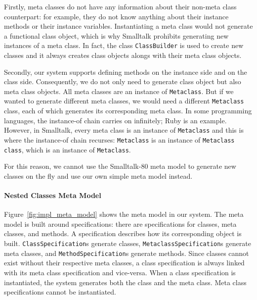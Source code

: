 Firstly, meta classes do not have any information about their non-meta class counterpart: for example, they do not know anything about their instance methods or their instance variables. Instantiating a meta class would not generate a functional class object, which is why Smalltalk prohibits generating new instances of a meta class. In fact, the class \texttt{ClassBuilder} is used to create new classes and it always creates class objects alongs with their meta class objects.

Secondly, our system supports defining methods on the instance side and on the class side. Consequently, we do not only need to generate class object but also meta class objects. All meta classes are an instance of \texttt{Metaclass}. But if we wanted to generate different meta classes, we would need a different \texttt{Metaclass} class, each of which generates its corresponding meta class. In some programming languages, the instance-of chain carries on infinitely; Ruby is an example. However, in Smalltalk, every meta class is an instance of \texttt{Metaclass} and this is where the instance-of chain recurses: \texttt{Metaclass} is an instance of \texttt{Metaclass class}, which is an instance of \texttt{Metaclass}.

For this reason, we cannot use the Smalltalk-80 meta model to generate new classes on the fly and use our own simple meta model instead.

\paragraph{Nested Classes Meta Model}
Figure~\ref{fig:impl_meta_model} shows the meta model in our system. The meta model is built around specifications: there are specifications for classes, meta classes, and methods. A specification describes how its corresponding object is built. \texttt{ClassSpecification}s generate classes, \texttt{MetaclassSpecification}s generate meta classes, and \texttt{MethodSpecification}s generate methods. Since classes cannot exist without their respective meta classes, a class specification is always linked with its meta class specification and vice-versa. When a class specification is instantiated, the system generates both the class and the meta class. Meta class specifications cannot be instantiated.

